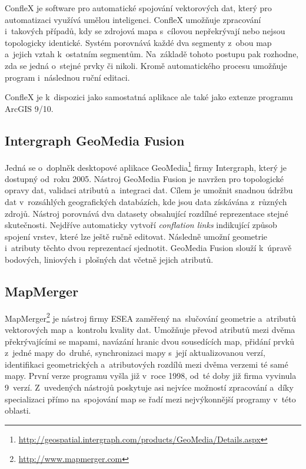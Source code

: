 ConfleX je software pro automatické spojování vektorových  dat,
který pro automatizaci využívá umělou inteligenci. ConfleX umožňuje zpracování 
i~takových případů, kdy se zdrojová mapa s~cílovou nepřekrývají nebo nejsou 
topologicky identické. Systém porovnává každé dva segmenty z~obou map a~jejich
vztah k~ostatním segmentům. Na~základě tohoto postupu pak rozhodne, zda se 
jedná o~stejné prvky či nikoli. Kromě automatického procesu umožňuje program 
i~následnou ruční editaci.

ConfleX je k~dispozici jako samostatná aplikace ale také jako extenze 
programu ArcGIS 9/10.


\subsection{Intergraph GeoMedia Fusion}
\label{geomedia}

Jedná se o~doplněk desktopové aplikace 
GeoMedia\footnote{\url{http://geospatial.intergraph.com/products/GeoMedia/Details.aspx}}
firmy Intergraph, který je dostupný od~roku 2005. Nástroj GeoMedia Fusion  
je navržen pro topologické opravy dat, validaci atributů a~integraci dat. Cílem 
je umožnit snadnou údržbu dat v~rozsáhlých geografických databázích, kde jsou 
data získávána z~různých zdrojů. Nástroj porovnává dva datasety obsahující 
rozdílné reprezentace stejné skutečnosti. Nejdříve automaticky vytvoří 
\textit{conflation links} indikující způsob spojení vrstev, které lze ještě
ručně editovat. Následně umožní geometrie i~atributy těchto dvou reprezentací
sjednotit. GeoMedia Fusion slouží k~úpravě bodových, liniových i~plošných dat
včetně jejich atributů. 


\subsection{MapMerger}
\label{mapmerger}

MapMerger\footnote{\url{http://www.mapmerger.com}} je  nástroj firmy 
ESEA zaměřený na~slučování geometrie a~atributů vektorových map a~kontrolu 
kvality dat. Umožňuje převod atributů mezi dvěma překrývajícími se mapami, 
navázání hranic dvou sousedících map, přidání prvků z~jedné mapy do~druhé, 
synchronizaci mapy s~její aktualizovanou verzí, identifikaci geometrických 
a~atributových rozdílů mezi dvěma verzemi té samé mapy. První verze programu 
vyšla již v~roce 1998, od~té doby již firma vyvinula 9~verzí. Z~uvedených 
nástrojů poskytuje asi nejvíce možností zpracování a~díky specializaci 
přímo na~spojování map se řadí mezi nejvýkonnější programy v~této oblasti. 


